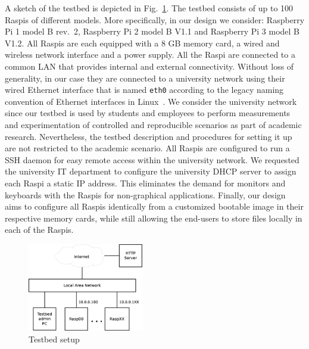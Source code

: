 \label{sec:overview}

A sketch of the testbed is depicted in Fig.~\ref{fig:testbed_setup}.
The testbed consists of up to 100 \ac{Raspi}s of different models.
More specifically, in our design we consider: Raspberry Pi 1 model B rev.~2,
Raspberry Pi 2 model B V1.1 and Raspberry Pi 3 model B V1.2.
All \ac{Raspi}s are each equipped with a 8 GB memory card, a wired and wireless
network interface and a power supply. All the \ac{Raspi} are connected to
a common \ac{LAN} that provides internal and external connectivity. Without
loss of generality, in our case they are connected to a university network
using their wired Ethernet interface that is named \texttt{eth0} according
to the legacy naming convention of Ethernet interfaces in
Linux~\cite{PredictableNetworkInterfaceNames}. We consider the
university network since our testbed is used by students and
employees to perform measurements and experimentation of controlled and
reproducible scenarios as part of academic research. Nevertheless, the
testbed description and procedures for setting it up are not restricted
to the academic scenario. All \ac{Raspi}s are configured to run
a \ac{SSH} daemon for easy remote access within the university network.
We requested the university \ac{IT} department to configure the university
\ac{DHCP} server to assign each \ac{Raspi} a static \ac{IP} address. This
eliminates the demand for monitors and keyboards with the \ac{Raspi}s
for non-graphical applications. Finally, our design aims to configure all
\ac{Raspi}s identically from a customized bootable image in their
respective memory cards, while still allowing the end-users to store
files locally in each of the \ac{Raspi}s.

\begin{figure}[ht!]
\centering
\includegraphics[width=0.45\textwidth]{images/testbed_setup3.eps}
\caption{Testbed setup}
\label{fig:testbed_setup}
\end{figure}


